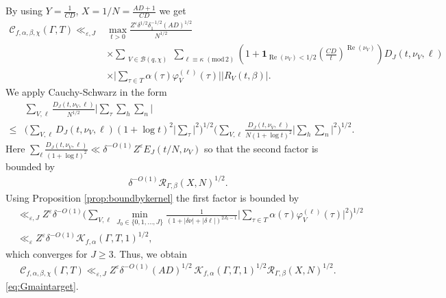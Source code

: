 \documentclass[12pt]{amsart}
\theoremstyle{definition}
\theoremstyle{remark}
\numberwithin{equation}{section}
\newcommand{\B}{\mathcal{B}}
\newcommand{\1}{{\mathbf 1}}
\newcommand{\eps}{\varepsilon}
\renewcommand{\Re}{\operatorname{Re}}
\renewcommand{\pmod}[1]{\,\,(\mathrm{mod}\,{#1})}
\begin{document}
 By using $Y=\frac{1}{CD}$, $X=1/N = \frac{AD+1}{CD}$ we get
\begin{align*}  \mathcal{C}_{f,\alpha,\beta,\chi}(\Gamma,T)   \ll_{\eps,J}& \max_{t >0} \frac{Z^\eps \delta^{1/2} \delta_1^{-1/2}(AD)^{1/2}}{N^{1/2}} \\
  &\times\sum_{\substack{V \in \B(q,\chi)  }} \sum_{\ell \equiv \kappa \pmod{2}}(1+\mathbf{1}_{\Re(\nu_V) < 1/2}( \tfrac{CD}{t}  )^{ \Re(\nu_V)})  D_J(t,\nu_V,\ell)  \\ & \times
\bigg| \sum_{\tau \in T} \alpha(\tau) \varphi_V^{(\ell)}(\tau)\bigg| |R_V(t,\beta)|. 
\end{align*}
We apply Cauchy-Schwarz in the form
\begin{align}\nonumber
    &\sum_{V,\ell}  \frac{D_J(t,\nu_V,\ell)}{N^{1/2}}\bigg| \sum_\tau \sum_h \sum_n \bigg| \\
    \leq& \bigg(  \sum_{V,\ell} D_J(t,\nu_V,\ell) (1+\log t)^2 \bigg| \label{eq:THEcauchyschwarz}\sum_\tau \bigg|^2 \bigg)^{1/2} \bigg(  \sum_{V,\ell} \frac{D_J(t,\nu_V,\ell)}{N (1+\log t)^2} \bigg|  \sum_h \sum_n \bigg|^2  \bigg)^{1/2}.
\end{align}
Here $\sum_\ell \frac{D_J(t,\nu_V,\ell)}{(1+\log t)^2}  \ll \delta^{-O(1)} Z^\eps E_J(t/N,\nu_V)$ so that the second factor is bounded by \begin{align*}
   \delta^{-O(1)} \mathcal{R}_{\Gamma,\beta}(X,N)^{1/2}.
\end{align*} 
Using Proposition \ref{prop:boundbykernel} the first factor is bounded by 
\begin{align*}
    &\ll_{\eps,J} Z^\eps \delta^{-O(1)}\bigg(\sum_{V,\ell} \min_{J_0\in \{0,1,\dots,J\}} \frac{1}{(1+|\delta \nu| + |\delta \ell|)^{2J_0-1}}  \bigg| \sum_{\tau \in T} \alpha(\tau) \varphi_V^{(\ell)}(\tau)\bigg| ^2\bigg)^{1/2} \\
   & \ll_\eps Z^\eps \delta^{-O(1)}\mathcal{K}_{f,\alpha}(\Gamma,T,1)^{1/2},
\end{align*}
which converges for $J \geq 3$. Thus, we obtain
\begin{align*}
\mathcal{C}_{f,\alpha,\beta,\chi}(\Gamma,T)  \ll_{\eps,J} Z^\eps \delta^{-O(1)}   (AD)^{1/2} \, \mathcal{K}_{f,\alpha}(\Gamma,T,1)^{1/2}\mathcal{R}_{\Gamma,\beta}(X,N)^{1/2}.
\end{align*}
\eqref{eq:Gmaintarget}.
\end{document}
